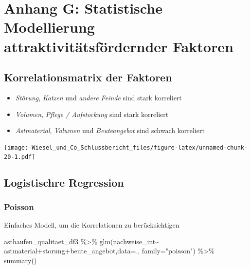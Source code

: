 \documentclass[
  oneside]{scrbook}
\newenvironment{Shaded}{\begin{snugshade}}{\end{snugshade}}
\newcommand{\AttributeTok}[1]{\textcolor[rgb]{0.77,0.63,0.00}{#1}}
\newcommand{\FunctionTok}[1]{\textcolor[rgb]{0.00,0.00,0.00}{#1}}
\newcommand{\NormalTok}[1]{#1}
\newcommand{\SpecialCharTok}[1]{\textcolor[rgb]{0.00,0.00,0.00}{#1}}
\newcommand{\StringTok}[1]{\textcolor[rgb]{0.31,0.60,0.02}{#1}}
\providecommand{\tightlist}{%
  \setlength{\itemsep}{0pt}\setlength{\parskip}{0pt}}
\begin{document}
\hypertarget{anhang-attraktivitaet-modell}{%
\section{Anhang G: Statistische Modellierung attraktivitätsfördernder Faktoren}\label{anhang-attraktivitaet-modell}}

\hypertarget{korrelationsmatrix-der-faktoren}{%
\subsection{Korrelationsmatrix der Faktoren}\label{korrelationsmatrix-der-faktoren}}

\begin{itemize}
\tightlist
\item
  \emph{Störung}, \emph{Katzen} und \emph{andere Feinde} sind stark korreliert
\item
  \emph{Volumen}, \emph{Pflege / Aufstockung} sind stark korreliert
\item
  \emph{Astmaterial}, \emph{Volumen} und \emph{Beuteangebot} sind schwach korreliert
\end{itemize}

\texttt{[image: Wiesel\_und\_Co\_Schlussbericht\_files/figure-latex/unnamed-chunk-20-1.pdf]}

\hypertarget{logistischre-regression}{%
\subsection{Logistischre Regression}\label{logistischre-regression}}

\hypertarget{poisson}{%
\subsubsection{Poisson}\label{poisson}}

Einfaches Modell, um die Korrelationen zu berücksichtigen

\begin{Shaded}
\begin{Highlighting}[]
\NormalTok{asthaufen\_qualitaet\_df3 }\SpecialCharTok{\%\textgreater{}\%} 
  \FunctionTok{glm}\NormalTok{(nachweise\_int}\SpecialCharTok{\textasciitilde{}}
\NormalTok{        astmaterial}\SpecialCharTok{+}\NormalTok{storung}\SpecialCharTok{+}\NormalTok{beute\_angebot,}\AttributeTok{data=}\NormalTok{.,}
      \AttributeTok{family=}\StringTok{"poisson"}\NormalTok{) }\SpecialCharTok{\%\textgreater{}\%} \FunctionTok{summary}\NormalTok{()}
\end{Highlighting}
\end{Shaded}
\end{document}
